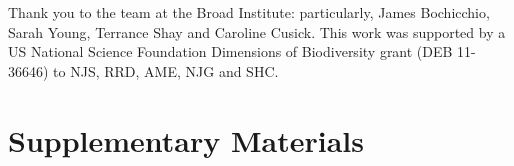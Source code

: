 \documentclass[fleqn,10pt,lineno]{wlpeerj} %
\begin{document}
Thank you to the team at the Broad Institute: particularly, James
Bochicchio, Sarah Young, Terrance Shay and Caroline Cusick. This work
was supported by a US National Science Foundation Dimensions of
Biodiversity grant (DEB 11-36646) to NJS, RRD, AME, NJG and SHC.



\newpage
\clearpage



\clearpage

\section*{Supplementary Materials}

\setcounter{figure}{0}
\setcounter{table}{0}

 
\end{document}
